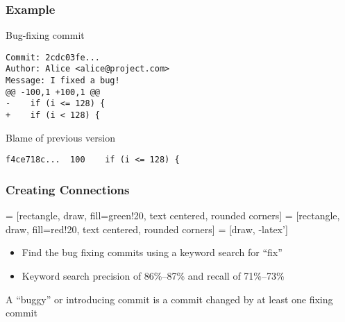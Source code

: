 \documentclass[aspectratio=43]{beamer}
\begin{document}
\begin{frame}[fragile]
  \frametitle{Example}

  \begin{block}{Bug-fixing commit}
    \begin{lstlisting}
Commit: 2cdc03fe...
Author: Alice <alice@project.com>
Message: I fixed a bug!
@@ -100,1 +100,1 @@
-    if (i <= 128) {
+    if (i < 128) {
    \end{lstlisting}
  \end{block}

  \begin{block}{Blame of previous version}
    \begin{lstlisting}
f4ce718c...  100    if (i <= 128) {
    \end{lstlisting}
  \end{block}

\end{frame}

\begin{frame}
  \frametitle{Creating Connections}

   = [rectangle, draw, fill=green!20, text centered, rounded corners]
   = [rectangle, draw, fill=red!20, text centered, rounded corners]
   = [draw, -latex']
  \begin{center}
  \end{center}
  
  \begin{itemize}

    \item Find the bug fixing commits using a keyword search for ``fix''

    \item Keyword search precision of 86\%--87\% and recall of 71\%--73\%

  \end{itemize}

  \begin{definition}
    A ``buggy'' or introducing commit is a commit changed by at least one fixing commit
  \end{definition}

\end{frame}
\end{document}
